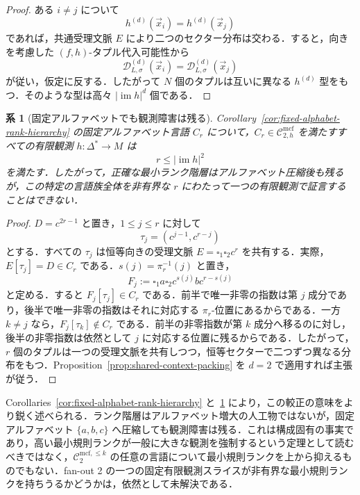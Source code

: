 \documentclass[11pt,a4paper]{ltjsarticle}
\numberwithin{equation}{section}
\theoremstyle{plain}
\newtheorem{corollary}[theorem]{系}
\theoremstyle{definition}
\theoremstyle{remark}
\newcommand{\Cmcf}[2]{\mathcal{C}^{\mathrm{mcf}}_{#1,#2}}
\newcommand{\Clatent}[2]{\mathcal{C}^{\mathrm{mcf},\le #2}_{#1}}
\newcommand{\D}{\mathcal{D}}
\newcommand{\tuple}[1]{\vec{#1}}
\newcommand{\blank}{\square}
\begin{document}
\begin{proof}
ある $i\ne j$ について
\[
  h^{(d)}(\tuple x_i)=h^{(d)}(\tuple x_j)
\]
であれば，共通受理文脈 $E$ により二つのセクター分布は交わる．すると，向きを考慮した $(f,h)$-タプル代入可能性から
\[
  \D_{L,\sigma}^{(d)}(\tuple x_i)
  =
  \D_{L,\sigma}^{(d)}(\tuple x_j)
\]
が従い，仮定に反する．したがって $N$ 個のタプルは互いに異なる $h^{(d)}$ 型をもつ．そのような型は高々 $|\operatorname{im}h|^d$ 個である．
\end{proof}

\begin{corollary}[固定アルファベットでも観測障害は残る]
\label{cor:fixed-alphabet-rank-observation}
Corollary~\ref{cor:fixed-alphabet-rank-hierarchy} の固定アルファベット言語 $C_r$ について，$C_r\in\Cmcf{2}{h}$ を満たすすべての有限観測
$h:\Delta^*\to M$ は
\[
  r\le |\operatorname{im}h|^2
\]
を満たす．したがって，正確な最小ランク階層はアルファベット圧縮後も残るが，この特定の言語族全体を非有界な $r$ にわたって一つの有限観測で証言することはできない．
\end{corollary}

\begin{proof}
$D=c^{2r-1}$ と置き，$1\le j\le r$ に対して
\[
  \tau_j=(c^{j-1},c^{r-j})
\]
とする．すべての $\tau_j$ は恒等向きの受理文脈
$E=\blank_1\blank_2c^r$ を共有する．実際，$E[\tau_j]=D\in C_r$ である．$s(j)=\pi_r^{-1}(j)$ と置き，
\[
  F_j:=\blank_1a\blank_2c^{s(j)}bc^{r-s(j)}
\]
と定める．すると $F_j[\tau_j]\in C_r$ である．前半で唯一非零の指数は第 $j$ 成分であり，後半で唯一非零の指数はそれに対応する $\pi_r$-位置にあるからである．一方 $k\ne j$ なら，$F_j[\tau_k]\notin C_r$ である．前半の非零指数が第 $k$ 成分へ移るのに対し，後半の非零指数は依然として $j$ に対応する位置に残るからである．したがって，$r$ 個のタプルは一つの受理文脈を共有しつつ，恒等セクターで二つずつ異なる分布をもつ．Proposition~\ref{prop:shared-context-packing} を $d=2$ で適用すれば主張が従う．
\end{proof}

Corollaries~\ref{cor:fixed-alphabet-rank-hierarchy} と~\ref{cor:fixed-alphabet-rank-observation} により，この較正の意味をより鋭く述べられる．ランク階層はアルファベット増大の人工物ではないが，固定アルファベット $\{a,b,c\}$ へ圧縮しても観測障害は残る．これは構成固有の事実であり，高い最小規則ランクが一般に大きな観測を強制するという定理として読むべきではなく，$\Clatent{2}{k}$ の任意の言語について最小規則ランクを上から抑えるものでもない．fan-out 2 の一つの固定有限観測スライスが非有界な最小規則ランクを持ちうるかどうかは，依然として未解決である．
\end{document}
